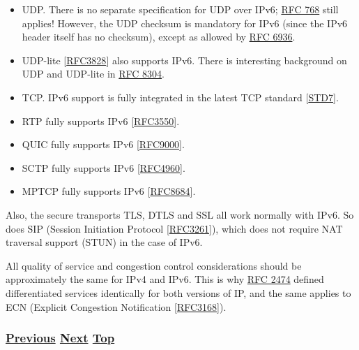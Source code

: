 \documentclass[
]{article}
\begin{document}
\begin{itemize}
\item
  UDP. There is no separate specification for UDP over IPv6;
  \href{https://www.rfc-editor.org/info/rfc768}{RFC 768} still applies!
  However, the UDP checksum is mandatory for IPv6 (since the IPv6 header
  itself has no checksum), except as allowed by
  \href{https://www.rfc-editor.org/info/rfc6936}{RFC 6936}.
\item
  UDP-lite {[}\href{https://www.rfc-editor.org/info/rfc3828}{RFC3828}{]}
  also supports IPv6. There is interesting background on UDP and
  UDP-lite in \href{https://www.rfc-editor.org/info/rfc8304}{RFC 8304}.
\item
  TCP. IPv6 support is fully integrated in the latest TCP standard
  {[}\href{https://www.rfc-editor.org/info/std7}{STD7}{]}.
\item
  RTP fully supports IPv6
  {[}\href{https://www.rfc-editor.org/info/rfc3550}{RFC3550}{]}.
\item
  QUIC fully supports IPv6
  {[}\href{https://www.rfc-editor.org/info/rfc9000}{RFC9000}{]}.
\item
  SCTP fully supports IPv6
  {[}\href{https://www.rfc-editor.org/info/rfc4960}{RFC4960}{]}.
\item
  MPTCP fully supports IPv6
  {[}\href{https://www.rfc-editor.org/info/rfc8684}{RFC8684}{]}.
\end{itemize}

Also, the secure transports TLS, DTLS and SSL all work normally with
IPv6. So does SIP (Session Initiation Protocol
{[}\href{https://www.rfc-editor.org/info/rfc3261}{RFC3261}{]}), which
does not require NAT traversal support (STUN) in the case of IPv6.

All quality of service and congestion control considerations should be
approximately the same for IPv4 and IPv6. This is why
\href{https://www.rfc-editor.org/info/rfc2474}{RFC 2474} defined
differentiated services identically for both versions of IP, and the
same applies to ECN (Explicit Congestion Notification
{[}\href{https://www.rfc-editor.org/info/rfc3168}{RFC3168}{]}).

\subsubsection{\texorpdfstring{\hyperref[routing]{Previous}
\hyperref[extension-headers-and-options]{Next}
\hyperref[ipv6-basic-technology]{Top}}{Previous Next Top}}\label{previous-next-top-16}

\pagebreak
\end{document}
